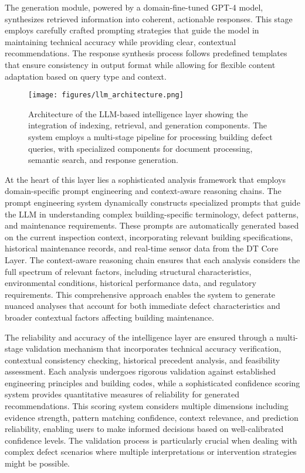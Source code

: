 \documentclass[a4paper,fleqn]{cas-sc}
\begin{document}
The generation module, powered by a domain-fine-tuned GPT-4 model, synthesizes retrieved information into coherent, actionable responses. This stage employs carefully crafted prompting strategies that guide the model in maintaining technical accuracy while providing clear, contextual recommendations. The response synthesis process follows predefined templates that ensure consistency in output format while allowing for flexible content adaptation based on query type and context.

\begin{figure}[!t]
\centering
\texttt{[image: figures/llm\_architecture.png]}
\caption{Architecture of the LLM-based intelligence layer showing the integration of indexing, retrieval, and generation components. The system employs a multi-stage pipeline for processing building defect queries, with specialized components for document processing, semantic search, and response generation.}
\label{fig:llm_architecture}
\end{figure}

At the heart of this layer lies a sophisticated analysis framework that employs domain-specific prompt engineering and context-aware reasoning chains. The prompt engineering system dynamically constructs specialized prompts that guide the LLM in understanding complex building-specific terminology, defect patterns, and maintenance requirements. These prompts are automatically generated based on the current inspection context, incorporating relevant building specifications, historical maintenance records, and real-time sensor data from the DT Core Layer. The context-aware reasoning chain ensures that each analysis considers the full spectrum of relevant factors, including structural characteristics, environmental conditions, historical performance data, and regulatory requirements. This comprehensive approach enables the system to generate nuanced analyses that account for both immediate defect characteristics and broader contextual factors affecting building maintenance.

The reliability and accuracy of the intelligence layer are ensured through a multi-stage validation mechanism that incorporates technical accuracy verification, contextual consistency checking, historical precedent analysis, and feasibility assessment. Each analysis undergoes rigorous validation against established engineering principles and building codes, while a sophisticated confidence scoring system provides quantitative measures of reliability for generated recommendations. This scoring system considers multiple dimensions including evidence strength, pattern matching confidence, context relevance, and prediction reliability, enabling users to make informed decisions based on well-calibrated confidence levels. The validation process is particularly crucial when dealing with complex defect scenarios where multiple interpretations or intervention strategies might be possible.
\end{document}
